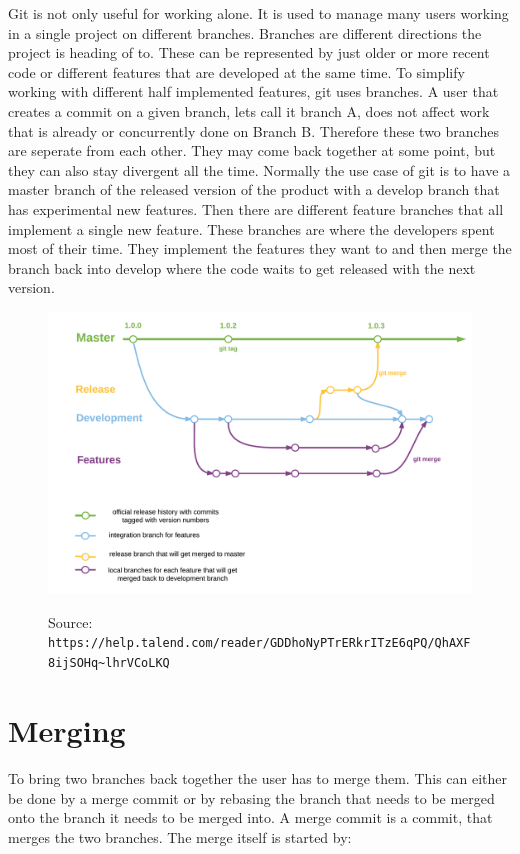 \documentclass[a4paper, 12pt]{article}
\begin{document}
		Git is not only useful for working alone. It is used to manage many users working in a single project on different branches. Branches are different directions the project is heading of to. These can be represented by just older or more recent code or different features that are developed at the same time. To simplify working with different half implemented features, git uses branches. A user that creates a commit on a given branch, lets call it branch A, does not affect work that is already or concurrently done on Branch B. Therefore these two branches are seperate from each other. They may come back together at some point, but they can also stay divergent all the time. Normally the use case of git is to have a master branch of the released version of the product with a develop branch that has experimental new features. Then there are different feature branches that all implement a single new feature. These branches are where the developers spent most of their time. They implement the features they want to and then merge the branch back into develop where the code waits to get released with the next version.
		
		\begin{figure}[h]
			\centering
			\includegraphics[width=.725\linewidth]{images/gitbranches.png}
			\label{fig1}
			\caption{Source: \newline\lstinline|https://help.talend.com/reader/GDDhoNyPTrERkrITzE6qPQ/QhAXF8ijSOHq~lhrVCoLKQ|}
		\end{figure}
		
	\section{Merging}
		
		To bring two branches back together the user has to merge them. This can either be done by a merge commit or by rebasing the branch that needs to be merged onto the branch it needs to be merged into. A merge commit is a commit, that merges the two branches. The merge itself is started by:
		
\end{document}
